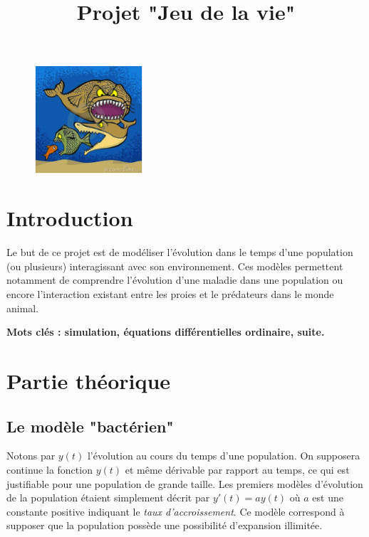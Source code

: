 \documentclass{../ficheTDTP}
\title{Projet "Jeu de la vie"}
\begin{document}
\maketitle

\begin{figure}[h]
\vspace{-5mm}
	\begin{center}
            \includegraphics[width=4cm]{proie-pred}
            
        \end{center}
	
\end{figure}


\section*{Introduction}

	Le but de ce projet est de modéliser l'évolution dans le temps d'une population (ou plusieurs) interagissant avec son environnement. Ces modèles permettent notamment de comprendre l'évolution d'une maladie dans une population ou encore l'interaction existant entre les proies et le prédateurs dans le monde animal.
	
\textbf{Mots clés : simulation, équations différentielles ordinaire, suite.}
    

		

\section{Partie théorique}

	
\subsection{Le modèle "bactérien"}

	Notons par $y(t)$ l'évolution au cours du temps d'une population. On supposera continue la fonction $y(t)$ et même dérivable par rapport au temps, ce qui est justifiable pour une population de grande taille. Les premiers modèles d'évolution de la population étaient simplement décrit par $y'(t) = a y(t)$ où $a$ est une constante positive indiquant le \textit{taux d'accroissement}. Ce modèle correspond à supposer que la population possède une possibilité d'expansion illimitée.\\
	
\end{document}
